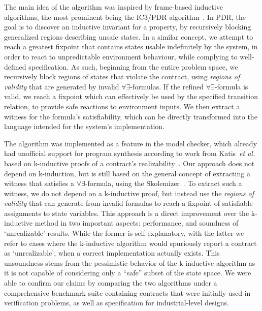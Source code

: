 The main idea of the algorithm was inspired by frame-based inductive algorithms, the most prominent being the IC3/PDR algorithm~\cite{bradley2011sat,een2011efficient}. In PDR, the goal is to discover an inductive invariant for a property, by recursively blocking generalized regions describing unsafe states. In a similar concept, we attempt
to reach a greatest fixpoint that contains states usable indefinitely by the
system, in order to react to unpredictable environment behaviour, while
complying to well-defined specification. As such, beginning from the entire
problem space, we recursively block regions of states that violate the contract, using \textit{regions of validity} that are
generated by invalid $\forall\exists$-formulas. If the refined
$\forall\exists$-formula is valid, we reach a fixpoint which can effectively be used by the specified transition relation, to
provide safe reactions to environment inputs. We then extract a witness for the
formula's satisfiability, which can be directly transformed into the
language intended for the system's implementation.

The algorithm was implemented as a feature in the \jkind model checker, which
already had unofficial support for program synthesis according to work from
Katis~\textit{et al.} based on k-inductive proofs of a contract's
realizability~\cite{gacek2015towards,katis2016towards,katis2016synthesis}.
Our approach does not depend on k-induction, but is still based on the general
concept of extracting a witness that satisfies a $\forall\exists$-formula, using
the \aeval Skolemizer~\cite{fedyukovich2015automated}. To extract such a witness, we do not depend on a k-inductive proof, but instead use the \textit{regions of validity} that \aeval can generate from invalid formulas
to reach a fixpoint of satisfiable assignments to state variables.
This approach is a direct improvement over the k-inductive method in two
important aspects: performance, and soundness of `unrealizable' results. While
the former is self-explanatory, with the latter we refer to cases where the
k-inductive algorithm would spuriously report a contract as `unrealizable', when a correct
implementation actually exists. This unsoundness stems from the pessimistic
behavior of the k-inductive algorithm as it is not capable of
considering only a ``safe'' subset of the state space. We were able to confirm our claims
by comparing the two algorithms under a comprehensive benchmark suite containing
contracts that were initially used in verification problems, as well as
specification for industrial-level designs.

